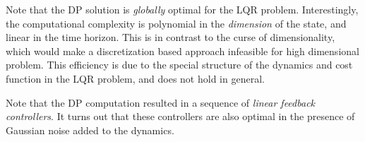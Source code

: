 
Note that the DP solution is \emph{globally} optimal for the LQR problem. Interestingly, the computational complexity is polynomial in the \textit{dimension} of the state, and linear in the time horizon. This is in contrast to the curse of dimensionality, which would make a discretization based approach infeasible for high dimensional problem. This efficiency is due to the special structure of the dynamics and cost function in the LQR problem, and does not hold in general.

\begin{remark}
    Note that the DP computation resulted in a sequence of \textit{linear feedback controllers}. It turns out that these controllers are also optimal in the presence of Gaussian noise added to the dynamics.
\end{remark}

